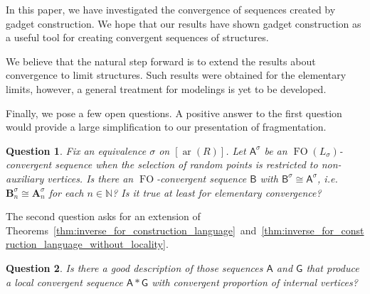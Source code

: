 \documentclass[11pt]{article}
\theoremstyle{plain}
\newtheorem*{question}{Question}
\theoremstyle{definition}
\theoremstyle{remark}
\DeclareMathOperator\aritysym{ar}
\newcommand{\arity}[1]{{\aritysym({#1})}}
\newcommand{\N}{\mathbb{N}}
\DeclareMathOperator\FO{FO}
\newcommand{\str}[1]{\mathbf{#1}}
\newcommand{\strseq}[1]{{\boldsymbol{\mathsf{#1}}}}
\begin{document}
In this paper, we have investigated the convergence of sequences created by gadget construction.
We hope that our results have shown gadget construction as a useful tool for creating convergent sequences of structures.

We believe that the natural step forward is to extend the results about convergence to limit structures.
Such results were obtained for the elementary limits, however, a general treatment for modelings is yet to be developed.

Finally, we pose a few open questions.
A positive answer to the first question would provide a large simplification to our presentation of fragmentation.

\begin{question}
    Fix an equivalence $\sigma$ on $[\arity{R}]$.
    Let $\strseq{A}^\sigma$ be an $\FO(L_\sigma)$-convergent sequence when the selection of random points is restricted to non-auxiliary vertices.
    Is there an $\FO$-convergent sequence $\strseq{B}$ with $\strseq{B}^\sigma \cong \strseq{A}^\sigma$, i.e. $\str{B}_n^\sigma \cong \str{A}_n^\sigma$ for each $n \in \N$?
    Is it true at least for elementary convergence?
\end{question}

The second question asks for an extension of Theorems~\ref{thm:inverse_for_construction_language}~and~\ref{thm:inverse_for_construction_language_without_locality}.

\begin{question}
    Is there a good description of those sequences $\strseq{A}$ and $\strseq{G}$ that produce a local convergent sequence $\strseq{A}*\strseq{G}$ with convergent proportion of internal vertices?
\end{question}

%
 
\printbibliography
\end{document}
